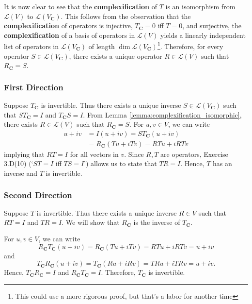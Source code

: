 \documentclass{article}
\begin{document}
It is now clear to see that the \textbf{complexification} of $T$ is an isomorphism from $\mathcal{L}(V)$ to $\mathcal{L}(V_{\mathbf{C}})$. 
This follows from the observation that the \textbf{complexification} of operators is injective, $T_{\mathbf{C}}=0$ iff $T=0$, and surjective, the \textbf{complexification} of a basis of operators in $\mathcal{L}(V)$ yields a linearly independent list of operators in $\mathcal{L}(V_{\mathbf{C}})$ of length $\operatorname{dim}\mathcal{L}(V_{\mathbf{C}})$\footnote{This could use a more rigorous proof, but that's a labor for another time}. Therefore, for every operator $S\in\mathcal{L}(V_{\mathbf{C}})$, there exists a unique operator $R\in\mathcal{L}(V)$ such that $R_{\mathbf{C}}=S$.

\subsubsection*{First Direction}
Suppose $T_{\mathbf{C}}$ is invertible. 
Thus there exists a unique inverse $S\in\mathcal{L}(V_{\mathbf{C}})$ such that $ST_{\mathbf{C}}=I$ and $T_{\mathbf{C}}S=I$. 
From Lemma \ref{lemma:complexification_isomorphic}, there exists $R\in\mathcal{L}(V)$ such that $R_{\mathbf{C}}=S$. 
For $u,v\in V$, we can write
\begin{align*}
    u+iv&=I(u+iv)=ST_{\mathbf{C}}(u+iv)\\
    &=R_{\mathbf{C}}(Tu+iTv)=RTu+iRTv
\end{align*}
implying that $RT=I$ for all vectors in $v$. 
Since $R,T$ are operators, Exercise 3.D(10) (`$ST=I$ iff $TS=I$') allows us to state that $TR=I$. 
Hence, $T$ has an inverse and $T$ is invertible.

\subsubsection*{Second Direction}
Suppose $T$ is invertible. Thus there exists a unique inverse $R\in V$ such that $RT=I$ and $TR=I$. 
We will show that $R_{\mathbf{C}}$ is the inverse of $T_{\mathbf{C}}$. 

For $u,v\in V$, we can write 
\begin{equation*}
    R_{\mathbf{C}}T_{\mathbf{C}}(u+iv)=R_{\mathbf{C}}(Tu+iTv)=RTu+iRTv=u+iv
\end{equation*}
and
\begin{equation*}
    T_{\mathbf{C}}R_{\mathbf{C}}(u+iv)=T_{\mathbf{C}}(Ru+iRv)=TRu+iTRv=u+iv.
\end{equation*}
Hence, $T_{\mathbf{C}}R_{\mathbf{C}}=I$ and $R_{\mathbf{C}}T_{\mathbf{C}}=I$. Therefore, $T_{\mathbf{C}}$ is invertible.
\end{document}
